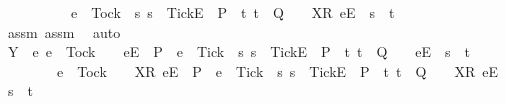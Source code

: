 \begin{isabellebody}
\ \ \ \ \ \ \ \ \ \ e\ {\isacharequal}\ Tock\ {\isasymand}\ {\isacharparenleft}{\isasymexists}s{\isachardot}\ s\ {\isacharat}\ {\isacharbrackleft}{\isacharbrackleft}Tick{\isacharbrackright}\isactrlsub E{\isacharbrackright}\ {\isasymin}\ P\ {\isasymand}\ {\isacharparenleft}{\isasymexists}t{\isachardot}\ t\ {\isasymin}\ Q\ {\isasymand}\ {\isasymrho}\ {\isacharat}\ {\isacharbrackleft}{\isacharbrackleft}X{\isacharbrackright}\isactrlsub R{\isacharcomma}\ {\isacharbrackleft}e{\isacharbrackright}\isactrlsub E{\isacharbrackright}\ {\isacharequal}\ s\ {\isacharat}\ t{\isacharparenright}{\isacharparenright}{\isacharbraceright}{\isachardoublequoteclose}\isanewline
\ \ \ \ \ \ \isamarkupfalse%
\ assm{}\ assm{}\ \isamarkupfalse%
\ auto\isanewline
\ \ \ \ \isamarkupfalse%
\ {\isachardoublequoteopen}Y\ {\isasyminter}\ {\isacharbraceleft}e{\isachardot}\ e\ {\isasymnoteq}\ Tock\ {\isasymand}\ {\isacharparenleft}{\isasymrho}\ {\isacharat}\ {\isacharbrackleft}{\isacharbrackleft}e{\isacharbrackright}\isactrlsub E{\isacharbrackright}\ {\isasymin}\ P\ {\isasymand}\ e\ {\isasymnoteq}\ Tick\ {\isasymor}\ {\isacharparenleft}{\isasymexists}s{\isachardot}\ s\ {\isacharat}\ {\isacharbrackleft}{\isacharbrackleft}Tick{\isacharbrackright}\isactrlsub E{\isacharbrackright}\ {\isasymin}\ P\ {\isasymand}\ {\isacharparenleft}{\isasymexists}t{\isachardot}\ t\ {\isasymin}\ Q\ {\isasymand}\ {\isasymrho}\ {\isacharat}\ {\isacharbrackleft}{\isacharbrackleft}e{\isacharbrackright}\isactrlsub E{\isacharbrackright}\ {\isacharequal}\ s\ {\isacharat}\ t{\isacharparenright}{\isacharparenright}{\isacharparenright}\ {\isasymor}\isanewline
\ \ \ \ \ \ \ \ e\ {\isacharequal}\ Tock\ {\isasymand}\ {\isacharparenleft}{\isasymrho}\ {\isacharat}\ {\isacharbrackleft}{\isacharbrackleft}X{\isacharbrackright}\isactrlsub R{\isacharcomma}\ {\isacharbrackleft}e{\isacharbrackright}\isactrlsub E{\isacharbrackright}\ {\isasymin}\ P\ {\isasymand}\ e\ {\isasymnoteq}\ Tick\ {\isasymor}\ {\isacharparenleft}{\isasymexists}s{\isachardot}\ s\ {\isacharat}\ {\isacharbrackleft}{\isacharbrackleft}Tick{\isacharbrackright}\isactrlsub E{\isacharbrackright}\ {\isasymin}\ P\ {\isasymand}\ {\isacharparenleft}{\isasymexists}t{\isachardot}\ t\ {\isasymin}\ Q\ {\isasymand}\ {\isasymrho}\ {\isacharat}\ {\isacharbrackleft}{\isacharbrackleft}X{\isacharbrackright}\isactrlsub R{\isacharcomma}\ {\isacharbrackleft}e{\isacharbrackright}\isactrlsub E{\isacharbrackright}\ {\isacharequal}\ s\ {\isacharat}\ t{\isacharparenright}{\isacharparenright}{\isacharparenright}{\isacharbraceright}\isanewline

\end{isabellebody}
